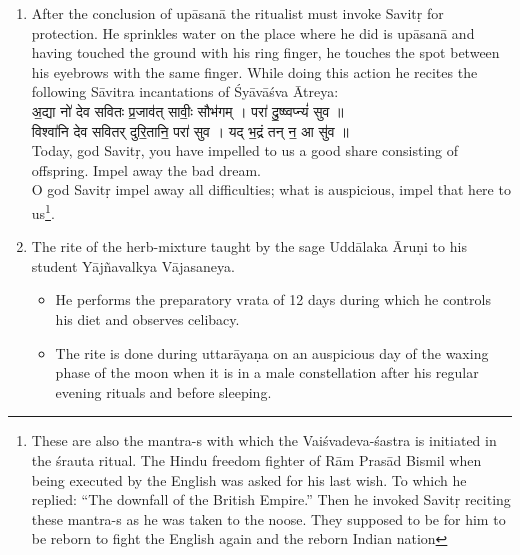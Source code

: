 \documentclass[12pt]{article}
\begin{document}
\begin{enumerate}
{\skt 
शुची॑ वो ह॒व्या म॑रुतः॒ शुची॑नां॒ \\
शुचिं॑ हिनोम्य् अध्व॒रं शुचि॑भ्यः ।\\
ऋ॒तेन॑ स॒त्यम् ऋ॑त॒साप॑ आय॒ञ् \\
 छुचि॑जन्मानः॒ शुच॑यः पाव॒काः ॥
}\\[8pt]
Pure oblations to you O Marut-s, the pure ones;\\
A pure ritual I offer to the pure ones;\\
By the ṛta the ṛta-knowers have attained truth,\\
of pure birth, they who are pure, the purifiers.\\
\item After the conclusion of upāsanā the ritualist must invoke Savitṛ for protection. He sprinkles water on the place where he did is upāsanā and having touched the ground with his ring finger, he touches the spot between his eyebrows with the same finger. While doing this action he recites the following Sāvitra incantations of Śyāvāśva Ātreya:\\[8pt]
{\skt
अ॒द्या नो॑ देव सवितः प्र॒जाव॑त् सावीः॒ सौभ॑गम् । परा॑ दु॒ष्ष्वप्न्यं॑ सुव ॥\\
विश्वा॑नि देव सवितर् दुरि॒तानि॒ परा॑ सुव । यद् भ॒द्रं तन् न॒ आ सु॑व ॥
}\\[8pt]
Today, god Savitṛ, you have impelled to us a good share consisting of offspring. Impel away the bad dream.\\
O god Savitṛ  impel away all difficulties; what is auspicious,  impel that here to us\footnote {These are also the mantra-s with which the Vaiśvadeva-śastra is initiated in the śrauta ritual. The Hindu freedom fighter of Rām Prasād Bismil when being executed by the English was asked for his last wish. To which he replied: ``The downfall of the British Empire.'' Then he invoked Savitṛ reciting these mantra-s as he was taken to the noose. They supposed to be for him to be reborn to fight the English again and the reborn Indian nation}.
\item The rite of the herb-mixture taught by the sage Uddālaka Āruṇi to his student Yājñavalkya Vājasaneya. 
\begin{itemize}
\item He performs the preparatory vrata of 12 days during which he controls his diet and observes celibacy.
\item The rite is done during uttarāyaṇa on an auspicious day of the waxing phase of the moon when it is in a male constellation after his regular evening rituals and before sleeping. 

\end{itemize}
\end{enumerate}
\end{document}
